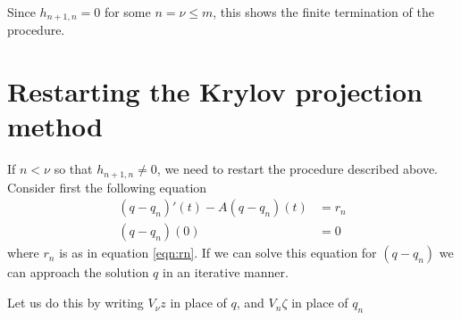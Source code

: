 Since $h_{n+1,n} = 0$ for some $n = \nu \leq m$, this shows the finite termination of the procedure.


\section{Restarting the Krylov projection method} \label{sec:rest}
If $n < \nu$ so that $h_{n+1,n} \neq 0$, we need to restart the procedure described above. Consider first the following equation
\begin{equation}\label{eqn:restkry}
\begin{aligned}
 (q-q_n)'(t) -A (q-q_n)(t) &= r_n \\
(q-q_n)(0)& = 0
\end{aligned}
\end{equation}
where $r_n$ is as in equation \eqref{eqn:rn}. If we can solve this equation for $(q-q_n)$ we can approach the solution $q$ in an iterative manner.

Let us do this by writing $V_\nu z$ in place of $q$, and $V_n \zeta $ in place of $q_n$

